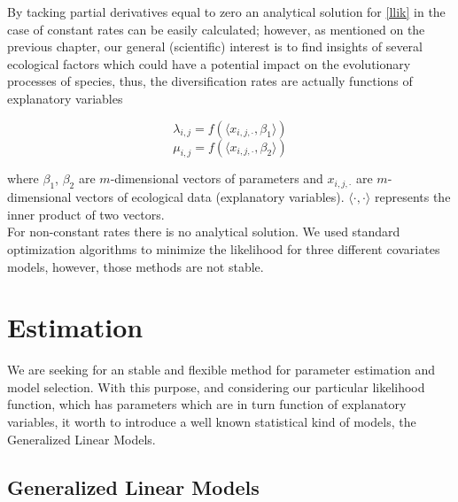  	

 	 
 By tacking partial derivatives equal to zero an analytical solution for \ref{llik} in the case of constant rates can be easily calculated; however, as mentioned on the previous chapter, our general (scientific) interest is to find insights of several ecological factors which could have a potential impact on the evolutionary processes of species, thus, the diversification rates are actually functions of explanatory variables
 

 $$ \lambda_{i,j} = f(\langle x_{i,j,\cdot}, \beta_1 \rangle ) $$
 $$ \mu_{i,j} = f(\langle x_{i,j,\cdot}, \beta_2 \rangle ) $$

where $\beta_1$, $\beta_2$ are $m$-dimensional vectors of parameters and $x_{i,j,\cdot}$ are $m$-dimensional vectors of ecological data (explanatory variables). $\langle \cdot, \cdot \rangle $ represents the inner product of two vectors.  \\


%
%
   
 For non-constant rates there is no analytical solution. We used standard optimization algorithms \cite{Bertsekas} to minimize the likelihood for three different covariates models, however, those methods are not stable. \\
 
   
 
 \section{Estimation}
 
 We are seeking for an stable and flexible method for parameter estimation and model selection. With this purpose, and considering our particular likelihood function, which has parameters which are in turn function of explanatory variables, it worth to introduce a well known statistical kind of models, the Generalized Linear Models.
 
\subsection{Generalized Linear Models}

